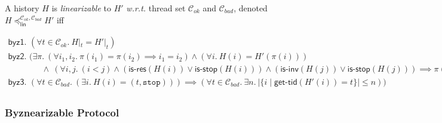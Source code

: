\documentclass[UTF8, 8pt, a4paper ]{ctexart}
\newcommand{\clientSet}{\mathcal{C}_{\textit{ok}}}
\newcommand{\faultyClients}{\mathcal{C}_{\textit{bad}}}
\begin{document}
\begin{small}
\begin{center}
\begin{comment}
	\end{definition}
	
	\begin{comment}
		\begin{definition}{{two histories are }\textit{weakly equivalent} {iff their projection to each thread are equal}:}
		
		$ H \equiv H'\ \triangleq \ \forall t.\  H|_t = H'|_t $
		
		\end{definition}
	\end{comment}
	
	\begin{definition} A history $ H $ is \textit{linearizable} to $ H' $ \textit{w.r.t.} thread set $ \clientSet $ and  $ \faultyClients $, denoted $ H \preceq_\textsf{lin}^{\clientSet, \faultyClients} H' $ iff 


	\quad $ \begin{array}{ll}
		\textsf{byz1. }  (\forall t \in \clientSet.\ H|_t = H'|_t)  \\
		\textsf{byz2. } (\exists \pi.\ (\forall i_1, i_2.\ \pi(i_1) = \pi(i_2) \implies i_1 = i_2) \land (\forall i.\ H(i) = H'(\pi(i)))\\
		 \qquad \qquad  \land \ (\forall i, j.\ (i < j) \land (\textsf{is-res}(H(i)) \lor  \textsf{is-stop}(H(i))) \land (\textsf{is-inv}(H(j)) \lor \textsf{is-stop}(H(j)) ) \implies \pi(i) < \pi(j))\\
		\textsf{byz3. } (\forall t \in \faultyClients.\ (\exists i.\ H(i) = (t,\texttt{stop}))) \implies (\forall t \in \faultyClients.\ \exists n.\ |\{ i \mid \textsf{get-tid}(H'(i)) = t \}| \leq n))  \\
		
		\end{array} $
		
		\vspace{0.2cm}
		
		
		
	\end{definition}


	\subsubsection{Byznearizable Protocol}
	

\end{center}
\end{small}
\end{document}
